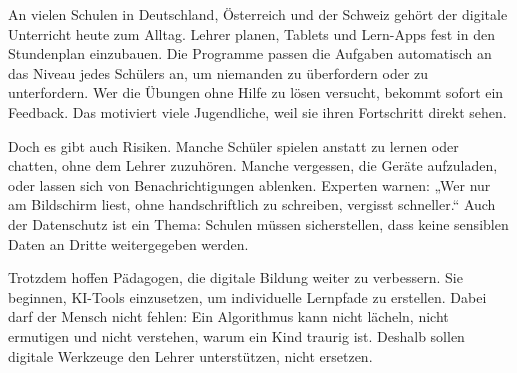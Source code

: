 \documentclass[11pt]{article}
\begin{document}
\begin{textebox}
An vielen Schulen in Deutschland, Österreich und der Schweiz gehört der digitale Unterricht heute zum Alltag. Lehrer planen, Tablets und Lern-Apps fest in den Stundenplan einzubauen. Die Programme passen die Aufgaben automatisch an das Niveau jedes Schülers an, um niemanden zu überfordern oder zu unterfordern. Wer die Übungen ohne Hilfe zu lösen versucht, bekommt sofort ein Feedback. Das motiviert viele Jugendliche, weil sie ihren Fortschritt direkt sehen.

Doch es gibt auch Risiken. Manche Schüler spielen anstatt zu lernen oder chatten, ohne dem Lehrer zuzuhören. Manche vergessen, die Geräte aufzuladen, oder lassen sich von Benachrichtigungen ablenken. Experten warnen: „Wer nur am Bildschirm liest, ohne handschriftlich zu schreiben, vergisst schneller.“ Auch der Datenschutz ist ein Thema: Schulen müssen sicherstellen, dass keine sensiblen Daten an Dritte weitergegeben werden.

Trotzdem hoffen Pädagogen, die digitale Bildung weiter zu verbessern. Sie beginnen, KI-Tools einzusetzen, um individuelle Lernpfade zu erstellen. Dabei darf der Mensch nicht fehlen: Ein Algorithmus kann nicht lächeln, nicht ermutigen und nicht verstehen, warum ein Kind traurig ist. Deshalb sollen digitale Werkzeuge den Lehrer unterstützen, nicht ersetzen.
\end{textebox}
\end{document}
